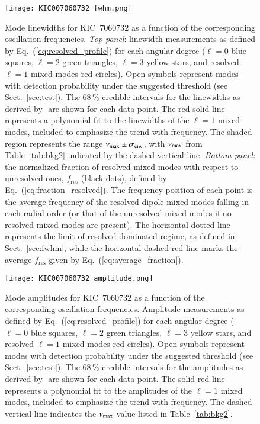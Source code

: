 \begin{figure}
   \centering
   \texttt{[image: KIC007060732\_fwhm.png]}
      \caption{Mode linewidths for KIC~7060732 as a function of the corresponding oscillation frequencies. \textit{Top panel}: linewidth measurements as defined by Eq.~(\ref{eq:resolved_profile}) for each angular degree ($\ell = 0$ blue squares, $\ell = 2$ green triangles, $\ell = 3$ yellow stars, and resolved $\ell = 1$ mixed modes red circles). Open symbols represent modes with detection probability under the suggested threshold (see Sect.~\ref{sec:test}). The 68\,\% credible intervals for the linewidths as derived by \diamonds\,\,are shown for each data point. The red solid line represents a polynomial fit to the linewidths of the $\ell = 1$ mixed modes, included to emphasize the trend with frequency. The shaded region represents the range $\nu_\mathrm{max} \pm \sigma_\mathrm{env}$, with $\nu_\mathrm{max}$ from Table~\ref{tab:bkg2} indicated by the dashed vertical line. \textit{Bottom panel}: the normalized fraction of resolved mixed modes with respect to unresolved ones, $f_\mathrm{res}$ (black dots), defined by Eq.~(\ref{eq:fraction_resolved}). The frequency position of each point is the average frequency of the resolved dipole mixed modes falling in each radial order (or that of the unresolved mixed modes if no resolved mixed modes are present). The horizontal dotted line represents the limit of resolved-dominated regime, as defined in Sect.~\ref{sec:fwhm}, while the horizontal dashed red line marks the average $f_\mathrm{res}$ given by Eq.~(\ref{eq:average_fraction}).}
    \label{fig:7060732fwhm}
\end{figure}

\begin{figure}
   \centering
   \texttt{[image: KIC007060732\_amplitude.png]}
      \caption{Mode amplitudes for KIC~7060732 as a function of the corresponding oscillation frequencies. Amplitude measurements as defined by Eq.~(\ref{eq:resolved_profile}) for each angular degree ($\ell = 0$ blue squares, $\ell = 2$ green triangles, $\ell = 3$ yellow stars, and resolved $\ell = 1$ mixed modes red circles). Open symbols represent modes with detection probability under the suggested threshold (see Sect.~\ref{sec:test}). The 68\,\% credible intervals for the amplitudes as derived by \diamonds\,\,are shown for each data point. The solid red line represents a polynomial fit to the amplitudes of the $\ell = 1$ mixed modes, included to emphasize the trend with frequency. The dashed vertical line indicates the $\nu_\mathrm{max}$ value listed in Table~\ref{tab:bkg2}.}
    \label{fig:7060732amplitude}
\end{figure}
\clearpage

